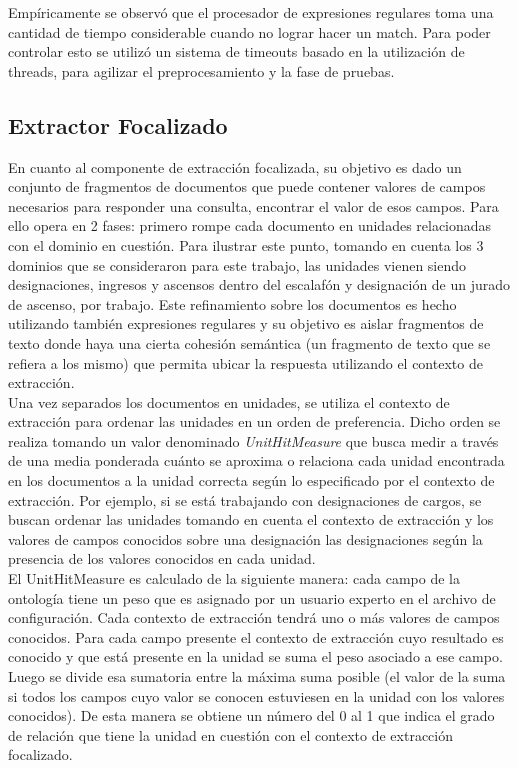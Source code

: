 Empíricamente se observó que el procesador de expresiones regulares toma una cantidad de tiempo considerable cuando no lograr hacer un match. Para poder controlar esto se utilizó un sistema de timeouts basado en la utilización de threads, para agilizar el preprocesamiento y la fase de pruebas. \\

\subsection{Extractor Focalizado}\label{sect:implementacion-extractorFocalizado}

En cuanto al componente de extracción focalizada, su objetivo es dado un conjunto de fragmentos de documentos que puede contener valores de campos necesarios para responder una consulta, encontrar el valor de esos campos. Para ello opera en 2 fases: primero rompe cada documento en unidades relacionadas con el dominio en cuestión. Para ilustrar este punto, tomando en cuenta los 3 dominios que se consideraron para este trabajo, las unidades vienen siendo designaciones, ingresos y ascensos dentro del escalafón y designación de un jurado de ascenso, por trabajo. Este refinamiento sobre los documentos es hecho utilizando también expresiones regulares y su objetivo es aislar fragmentos de texto donde haya una cierta cohesión semántica (un fragmento de texto que se refiera a los mismo) que permita ubicar la respuesta utilizando el contexto de extracción. \\

Una vez separados los documentos en unidades, se utiliza el contexto de extracción para ordenar las unidades en un orden de preferencia. Dicho orden se realiza tomando un valor denominado \emph{UnitHitMeasure} que busca medir a través de una media ponderada cuánto se aproxima o relaciona cada unidad encontrada en los documentos a la unidad correcta según lo especificado por el contexto de extracción. Por ejemplo, si se está trabajando con designaciones de cargos, se buscan ordenar las unidades tomando en cuenta el contexto de extracción y los valores de campos conocidos sobre una designación las designaciones según la presencia de los valores conocidos en cada unidad.\\

El UnitHitMeasure es calculado de la siguiente manera: cada campo de la ontología tiene un peso que es asignado por un usuario experto en el archivo de configuración. Cada contexto de extracción tendrá uno o más valores de campos conocidos. Para cada campo presente el contexto de extracción cuyo resultado es conocido y que está presente en la unidad se suma el peso asociado a ese campo. Luego se divide esa sumatoria entre la máxima suma posible (el valor de la suma si todos los campos cuyo valor se conocen estuviesen en la unidad con los valores conocidos). De esta manera se obtiene un número del 0 al 1 que indica el grado de relación que tiene la unidad en cuestión con el contexto de extracción focalizado.\\

